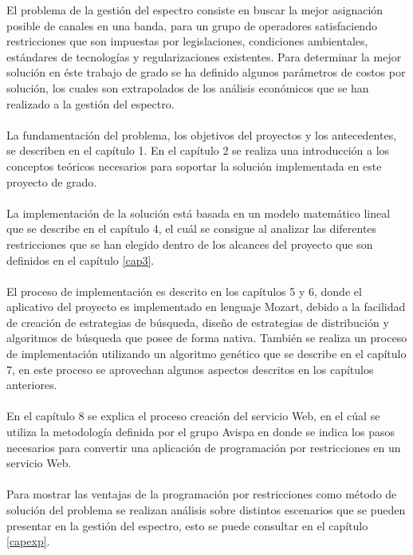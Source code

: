 El problema de la gestión del espectro consiste en buscar la mejor asignación posible de canales en una banda, para un grupo de operadores satisfaciendo restricciones que son impuestas por legislaciones, condiciones ambientales, estándares de tecnologías y regularizaciones existentes. Para determinar la mejor solución en éste trabajo de grado se ha definido algunos parámetros de costos por solución, los cuales son extrapolados de los análisis económicos que se han realizado a la gestión del espectro.
\\\\
La fundamentación del problema, los objetivos del proyectos y los antecedentes, se describen en el capítulo 1. En el capítulo 2 se realiza una introducción a los conceptos teóricos necesarios para soportar la solución implementada en este proyecto de grado.
\\\\ 
La implementación de la solución está basada en un modelo matemático lineal que se describe en el capítulo 4, el cuál se consigue al analizar las diferentes restricciones que se han elegido dentro de los alcances del proyecto que son definidos en el capítulo \ref{cap3}.
\\\\
El proceso de implementación es descrito en los capítulos 5 y 6, donde el aplicativo del proyecto es implementado en lenguaje Mozart, debido a la facilidad de creación de estrategias de búsqueda, diseño de estrategias de distribución y algoritmos de búsqueda que posee de forma nativa. También se realiza un proceso de implementación utilizando un algoritmo genético que se describe en el capítulo 7, en este proceso se aprovechan algunos aspectos descritos en los capítulos anteriores.
\\\\
En el capítulo 8 se explica el proceso creación del servicio Web, en el cúal se utiliza la metodología definida por el grupo Avispa\cite{Metodologia} en donde se indica los pasos necesarios para convertir una aplicación de programación por restricciones en un servicio Web.
\\\\
Para mostrar las ventajas de la programación por restricciones como método de solución del problema se realizan análisis sobre distintos escenarios que se pueden presentar en la gestión del espectro, esto se puede consultar en el capítulo \ref{capexp}.
